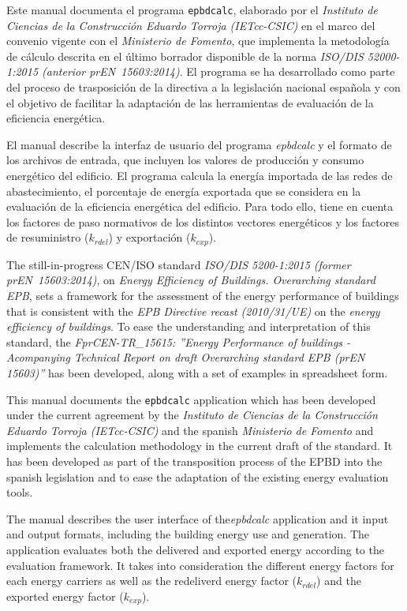 \documentclass[10pt,notitlepage,oneside,a4paper]{article}
\begin{document}
Este manual documenta el programa \texttt{epbdcalc}, elaborado por el \textit{Instituto de Ciencias de la Construcción Eduardo Torroja (IETcc-CSIC)} en el marco del convenio vigente con el \textit{Ministerio de Fomento}, que implementa la metodología de cálculo descrita en el último borrador disponible de la norma \textit{ISO/DIS 52000-1:2015 (anterior prEN~15603:2014)}. El programa se ha desarrollado como parte del proceso de trasposición de la directiva a la legislación nacional española y con el objetivo de facilitar la adaptación de las herramientas de evaluación de la eficiencia energética.

El manual describe la interfaz de usuario del programa \textit{epbdcalc} y el formato de los archivos de entrada, que incluyen los valores de producción y consumo energético del edificio.
El programa calcula la energía importada de las redes de abastecimiento, el porcentaje de energía exportada que se considera en la evaluación de la eficiencia energética del edificio. Para todo ello, tiene en cuenta los factores de paso normativos de los distintos vectores energéticos y los factores de resuministro ($k_{rdel}$) y exportación ($k_{exp}$).

\begin{myquote}\footnotesize
    The still-in-progress CEN/ISO standard \textit{ISO/DIS 5200-1:2015 (former prEN~15603:2014)}, on \textit{Energy Efficiency of Buildings. Overarching standard EPB}, sets a framework for the assessment of the energy performance of buildings that is consistent with the \textit{EPB Directive recast (2010/31/UE)} on the \textit{energy efficiency of buildings}. To ease the understanding and interpretation of this standard, the \textit{FprCEN-TR\_15615: ''Energy Performance of buildings - Acompanying Technical Report on draft Overarching standard EPB (prEN 15603)''} has been developed, along with a set of examples in spreadsheet form.

This manual documents the \texttt{epbdcalc} application which has been developed under the current agreement by the \textit{Instituto de Ciencias de la Construcción Eduardo Torroja (IETcc-CSIC)} and the spanish \textit{Ministerio de Fomento} and implements the calculation methodology in the current draft of the standard. It has been developed as part of the transposition process of the EPBD into the spanish legislation and to ease the adaptation of the existing energy evaluation tools.

The manual describes the user interface of the\textit{epbdcalc} application and it input and output formats, including the building energy use and generation.
The application evaluates both the delivered and exported energy according to the evaluation framework. It takes into consideration the different energy factors for each energy carriers as well as the redeliverd energy factor ($k_{rdel}$) and the exported energy factor ($k_{exp}$).
\end{myquote}
\end{document}
